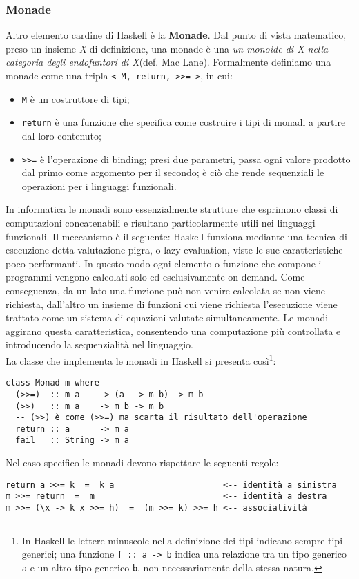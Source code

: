 \subsubsection{Monade}
Altro elemento cardine di Haskell è la \textbf{Monade}. Dal punto di vista matematico, preso un insieme \textit{X} di definizione, una monade è una \textit{un monoide di X nella categoria degli endofuntori di X}(def. Mac Lane\cite{maclane}). Formalmente definiamo una monade come una tripla \texttt{< M, return, >{}>= >}, in cui:
\begin{itemize}
\item{\texttt{M} è un costruttore di tipi;}
\item{\texttt{return} è una funzione che specifica come costruire i tipi di monadi a partire dal loro contenuto;}
\item{\texttt{>{}>=} è l'operazione di binding; presi due parametri, passa ogni valore prodotto dal primo come argomento per il secondo; è ciò che rende sequenziali le operazioni per i linguaggi funzionali.}
\end{itemize}
In informatica le monadi sono essenzialmente strutture che esprimono classi di computazioni concatenabili e risultano particolarmente utili nei linguaggi funzionali. Il meccanismo è il seguente: Haskell funziona mediante una tecnica di esecuzione detta valutazione pigra, o lazy evaluation, viste le sue caratteristiche poco performanti. In questo modo ogni elemento o funzione che compone i programmi vengono calcolati solo ed esclusivamente on-demand. Come conseguenza, da un lato una funzione può non venire calcolata se non viene richiesta, dall'altro un insieme di funzioni cui viene richiesta l'esecuzione viene trattato come un sistema di equazioni valutate simultaneamente. Le monadi aggirano questa caratteristica, consentendo una computazione più controllata e introducendo la sequenzialità nel linguaggio.\\
La classe che implementa le monadi in Haskell si presenta così\footnote{In Haskell le lettere minuscole nella definizione dei tipi indicano sempre tipi generici; una funzione \texttt{f :: a -> b} indica una relazione tra un tipo generico \texttt{a} e un altro tipo generico \texttt{b}, non necessariamente della stessa natura.}:
\begin{verbatim}
class Monad m where
  (>>=)  :: m a    -> (a  -> m b) -> m b
  (>>)   :: m a    -> m b -> m b            
  -- (>>) è come (>>=) ma scarta il risultato dell'operazione
  return :: a      -> m a
  fail   :: String -> m a
\end{verbatim}
Nel caso specifico le monadi devono rispettare le seguenti regole:
\begin{verbatim}
return a >>= k  =  k a                      <-- identità a sinistra
m >>= return  =  m                          <-- identità a destra
m >>= (\x -> k x >>= h)  =  (m >>= k) >>= h <-- associatività
\end{verbatim}
